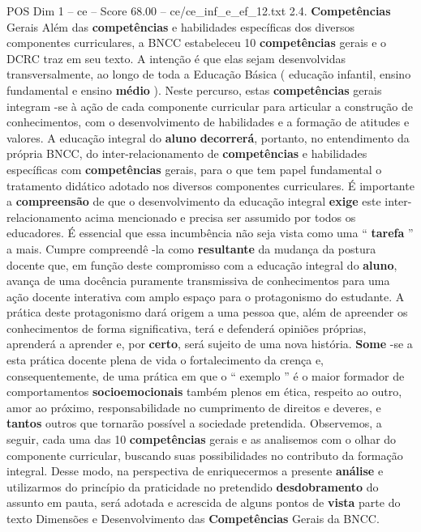 \begin{textsample}{POS Dim 1 – ce – Score 68.00 – ce/ce\_inf\_e\_ef\_12.txt}  \label{ex:f1_pos_045}
2.4. \textbf{Competências} Gerais Além das \textbf{competências} e habilidades específicas dos diversos componentes curriculares, a BNCC estabeleceu 10 \textbf{competências} gerais e o DCRC traz em seu texto.
A intenção é que elas sejam desenvolvidas transversalmente, ao longo de toda a Educação Básica ( educação infantil, ensino fundamental e ensino \textbf{médio} ).
Neste percurso, estas \textbf{competências} gerais integram -se à ação de cada componente curricular para articular a construção de conhecimentos, com o desenvolvimento de habilidades e a formação de atitudes e valores.
A educação integral do \textbf{aluno} \textbf{decorrerá}, portanto, no entendimento da própria BNCC, do inter-relacionamento de \textbf{competências} e habilidades específicas com \textbf{competências} gerais, para o que tem papel fundamental o tratamento didático adotado nos diversos componentes curriculares.
É importante a \textbf{compreensão} de que o desenvolvimento da educação integral \textbf{exige} este inter-relacionamento acima mencionado e precisa ser assumido por todos os educadores.
É essencial que essa incumbência não seja vista como uma “ \textbf{tarefa} ” a mais.
Cumpre compreendê -la como \textbf{resultante} da mudança da postura docente que, em função deste compromisso com a educação integral do \textbf{aluno}, avança de uma docência puramente transmissiva de conhecimentos para uma ação docente interativa com amplo espaço para o protagonismo do estudante.
A prática deste protagonismo dará origem a uma pessoa que, além de apreender os conhecimentos de forma significativa, terá e defenderá opiniões próprias, aprenderá a aprender e, por \textbf{certo}, será sujeito de uma nova história. \textbf{Some} -se a esta prática docente plena de vida o fortalecimento da crença e, consequentemente, de uma prática em que o “ exemplo ” é o maior formador de comportamentos \textbf{socioemocionais} também plenos em ética, respeito ao outro, amor ao próximo, responsabilidade no cumprimento de direitos e deveres, e \textbf{tantos} outros que tornarão possível a sociedade pretendida.
Observemos, a seguir, cada uma das 10 \textbf{competências} gerais e as analisemos com o olhar do componente curricular, buscando suas possibilidades no contributo da formação integral.
Desse modo, na perspectiva de enriquecermos a presente \textbf{análise} e utilizarmos do princípio da praticidade no pretendido \textbf{desdobramento} do assunto em pauta, será adotada e acrescida de alguns pontos de \textbf{vista} parte do texto Dimensões e Desenvolvimento das \textbf{Competências} Gerais da BNCC.

\end{textsample}
